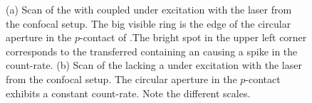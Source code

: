 	\begin{figure}[htp]
		\begin{subfigure}[t]{ 0.49\linewidth}
			\centering
			\caption{}
			\label{subfig::vcsel_confocal_laser_excitation_with_diamond}
		\end{subfigure}
		\hfill
		\begin{subfigure}[t]{ 0.49\linewidth}
			\centering
			\caption{}
			\label{subfig::confocal_laser_excitation_without_diamond}
		\end{subfigure}
		\caption[Scans of \VCSELs with and without \siv]{(a) Scan of the \BmFour with coupled \nd under excitation with the laser from the confocal setup. The big visible ring is the edge of the circular aperture in the $p$-contact of \BmFour.The bright spot in the upper left corner corresponds to the transferred \nd containing an \siv causing a spike in the count-rate. (b) Scan of the \BmTwo lacking a \nd under excitation with the laser from the confocal setup. The circular aperture in the $p$-contact exhibits a constant count-rate. Note the different scales.}
	\end{figure}

